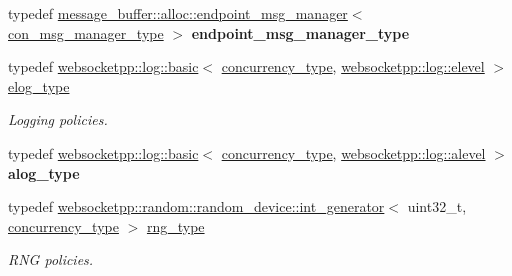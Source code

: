 \begin{DoxyCompactItemize}
\item 
\mbox{\label{structwebsocketpp_1_1config_1_1core__client_a1ccd94e4f4d1102cdb81b98284ed1166}} 
typedef \mbox{\hyperlink{classwebsocketpp_1_1message__buffer_1_1alloc_1_1endpoint__msg__manager}{message\+\_\+buffer\+::alloc\+::endpoint\+\_\+msg\+\_\+manager}}$<$ \mbox{\hyperlink{classwebsocketpp_1_1message__buffer_1_1alloc_1_1con__msg__manager}{con\+\_\+msg\+\_\+manager\+\_\+type}} $>$ {\bfseries endpoint\+\_\+msg\+\_\+manager\+\_\+type}
\item 
\mbox{\label{structwebsocketpp_1_1config_1_1core__client_a24f1bae9e8a92bf7950153ed39eaffb8}} 
typedef \mbox{\hyperlink{classwebsocketpp_1_1log_1_1basic}{websocketpp\+::log\+::basic}}$<$ \mbox{\hyperlink{classwebsocketpp_1_1concurrency_1_1basic}{concurrency\+\_\+type}}, \mbox{\hyperlink{structwebsocketpp_1_1log_1_1elevel}{websocketpp\+::log\+::elevel}} $>$ \mbox{\hyperlink{structwebsocketpp_1_1config_1_1core__client_a24f1bae9e8a92bf7950153ed39eaffb8}{elog\+\_\+type}}
\begin{DoxyCompactList}\small\item\em Logging policies. \end{DoxyCompactList}\item 
\mbox{\label{structwebsocketpp_1_1config_1_1core__client_a98c19fba0898e3842c001248df82fb2a}} 
typedef \mbox{\hyperlink{classwebsocketpp_1_1log_1_1basic}{websocketpp\+::log\+::basic}}$<$ \mbox{\hyperlink{classwebsocketpp_1_1concurrency_1_1basic}{concurrency\+\_\+type}}, \mbox{\hyperlink{structwebsocketpp_1_1log_1_1alevel}{websocketpp\+::log\+::alevel}} $>$ {\bfseries alog\+\_\+type}
\item 
\mbox{\label{structwebsocketpp_1_1config_1_1core__client_adacb3a0ec249a2dea11871f299cf660f}} 
typedef \mbox{\hyperlink{classwebsocketpp_1_1random_1_1random__device_1_1int__generator}{websocketpp\+::random\+::random\+\_\+device\+::int\+\_\+generator}}$<$ uint32\+\_\+t, \mbox{\hyperlink{classwebsocketpp_1_1concurrency_1_1basic}{concurrency\+\_\+type}} $>$ \mbox{\hyperlink{structwebsocketpp_1_1config_1_1core__client_adacb3a0ec249a2dea11871f299cf660f}{rng\+\_\+type}}
\begin{DoxyCompactList}\small\item\em R\+NG policies. \end{DoxyCompactList}\item 

\end{DoxyCompactItemize}
